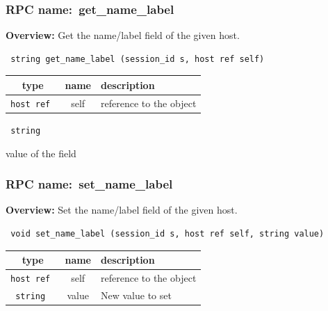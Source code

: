 \subsubsection{RPC name:~get\_name\_label}

{\bf Overview:} 
Get the name/label field of the given host.

\begin{verbatim} string get_name_label (session_id s, host ref self)\end{verbatim}



 
\vspace{0.3cm}
\begin{tabular}{|c|c|p{7cm}|}
 \hline
{\bf type} & {\bf name} & {\bf description} \\ \hline
{\tt host ref } & self & reference to the object \\ \hline 

\end{tabular}

\vspace{0.3cm}

{\tt 
string
}


value of the field
\vspace{0.3cm}
\vspace{0.3cm}
\vspace{0.3cm}
\subsubsection{RPC name:~set\_name\_label}

{\bf Overview:} 
Set the name/label field of the given host.

\begin{verbatim} void set_name_label (session_id s, host ref self, string value)\end{verbatim}



 
\vspace{0.3cm}
\begin{tabular}{|c|c|p{7cm}|}
 \hline
{\bf type} & {\bf name} & {\bf description} \\ \hline
{\tt host ref } & self & reference to the object \\ \hline 

{\tt string } & value & New value to set \\ \hline 

\end{tabular}

